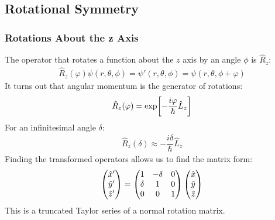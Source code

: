 \subsection{Rotational Symmetry}
\subsubsection{Rotations About the z Axis}
The operator that rotates a function about the $z$ axis by an angle $\phi$ is $\hat{R}_z$:
\begin{align*}
  \hat{R}_z(\varphi)\psi(r,\theta,\phi)=\psi'(r,\theta,\phi)=\psi(r,\theta,\phi+\varphi)
\end{align*}
It turns out that angular momentum is the generator of rotations:
\begin{align*}
  \hat{R}_z(\varphi)=\mathrm{exp}\qty[-\dfrac{i\varphi}{\hbar}\hat{L}_z]
\end{align*}
For an infinitesimal angle $\delta$:
\begin{align*}
  \hat{R}_z(\delta)\approx -\dfrac{i\delta}{\hbar}\hat{L}_z
\end{align*}
Finding the transformed operators allows us to find the matrix form:
\begin{align*}
  \pmqty{\hat{x}'\\\hat{y}'\\\hat{z}'}=
  \pmqty{1&-\delta&0\\\delta&1&0\\0&0&1}\pmqty{\hat{x}\\\hat{y}\\\hat{z}}
\end{align*}
This is a truncated Taylor series of a normal rotation matrix.
